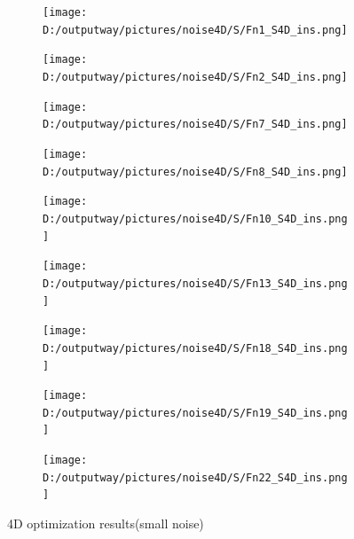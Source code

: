 \documentclass{article}
\begin{document}
\begin{figure}[H]
    \centering
    \begin{subfigure}[t]{.32\linewidth}
        \centering
        \texttt{[image: D:/outputway/pictures/noise4D/S/Fn1\_S4D\_ins.png]}
    \end{subfigure}
    \begin{subfigure}[t]{.32\linewidth}
        \centering
        \texttt{[image: D:/outputway/pictures/noise4D/S/Fn2\_S4D\_ins.png]}
    \end{subfigure}
    \begin{subfigure}[t]{.32\linewidth}
        \centering
        \texttt{[image: D:/outputway/pictures/noise4D/S/Fn7\_S4D\_ins.png]}
    \end{subfigure}
    \begin{subfigure}[t]{.32\linewidth}
        \centering
        \texttt{[image: D:/outputway/pictures/noise4D/S/Fn8\_S4D\_ins.png]}
    \end{subfigure}
    \begin{subfigure}[t]{.32\linewidth}
        \centering
        \texttt{[image: D:/outputway/pictures/noise4D/S/Fn10\_S4D\_ins.png]}
    \end{subfigure}
    \begin{subfigure}[t]{.32\linewidth}
        \centering
        \texttt{[image: D:/outputway/pictures/noise4D/S/Fn13\_S4D\_ins.png]}
    \end{subfigure}
    \begin{subfigure}[t]{.32\linewidth}
        \centering
        \texttt{[image: D:/outputway/pictures/noise4D/S/Fn18\_S4D\_ins.png]}
    \end{subfigure}
    \begin{subfigure}[t]{.32\linewidth}
        \centering
        \texttt{[image: D:/outputway/pictures/noise4D/S/Fn19\_S4D\_ins.png]}
    \end{subfigure}
    \begin{subfigure}[t]{.32\linewidth}
        \centering
        \texttt{[image: D:/outputway/pictures/noise4D/S/Fn22\_S4D\_ins.png]}
    \end{subfigure}
    \caption{4D optimization results(small noise)}
    \label{Fig4}
\end{figure}
\end{document}
